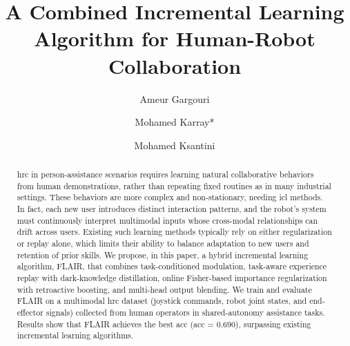 \documentclass[3p,times,procedia]{elsarticle}
\begin{document}
\begin{frontmatter}


\title{A Combined Incremental Learning Algorithm for Human-Robot Collaboration}


\author[a,b]{Ameur Gargouri}
\author[b]{Mohamed Karray*}
\author[a]{Mohamed Ksantini}

\address[a]{ATISP Lab, ENET'Com, University of Sfax, Sfax, Tunisia}
\address[b]{ESME Research Lab, Ivry-sur-Seine, France}

\begin{abstract}
\ac{hrc} in person-assistance scenarios requires learning natural collaborative behaviors from human demonstrations, rather than repeating fixed routines as in many industrial settings. These behaviors are more complex and non-stationary, needing \ac{icl} methods. In fact, each new user introduces distinct interaction patterns, and the robot's system must continuously interpret multimodal inputs whose cross-modal relationships can drift across users. Existing such learning methods typically rely on either regularization or replay alone, which limits their ability to balance adaptation to new users and retention of prior skills. We propose, in this paper, a hybrid incremental learning algorithm, FLAIR, that combines task-conditioned modulation, task-aware experience replay with dark-knowledge distillation, online Fisher-based importance regularization with retroactive boosting, and multi-head output blending. We train and evaluate FLAIR on a multimodal \ac{hrc} dataset (joystick commands, robot joint states, and end-effector signals) collected from human operators in shared-autonomy assistance tasks. Results show that FLAIR achieves the best \ac{acc} (\ac{acc} = 0.690), surpassing existing incremental learning algorithms.
\end{abstract}


\end{frontmatter}
\end{document}
